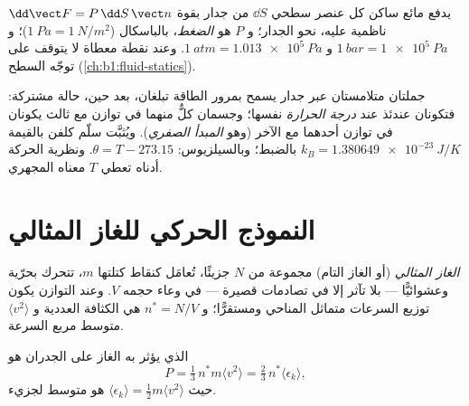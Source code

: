 \begin{definition}[الضغط]\label{def:b1:kinetic-theory:pressure}
يدفع مائع ساكن كل عنصر سطحي $\dd S$ من جدار بقوة
$\dd\vect F = P\,\dd S\,\vect n$ ناظمية عليه، نحو الجدار؛ و $P$ هو
\emph{الضغط}، بالباسكال ($\qty{1}{Pa} = \qty{1}{N/m^2}$)؛ و $\qty{1}{bar}
= \qty{1e5}{Pa}$ و $\qty{1}{atm} = \qty{1.013e5}{Pa}$. وعند نقطة معطاة لا
يتوقف على توجّه السطح (\cref{ch:b1:fluid-statics}).
\end{definition}

\begin{definition}\label{def:b1:kinetic-theory:temperature}
جملتان متلامستان عبر جدار يسمح بمرور الطاقة تبلغان، بعد
حين، حالة مشتركة: فتكونان عندئذ عند \emph{درجة الحرارة} نفسها؛
وجسمان كلٌّ منهما في توازن مع ثالث يكونان في توازن أحدهما
مع الآخر (وهو \emph{المبدأ الصفري}). ويُثبَّت سلّم كلفن بالقيمة
$k_B = \qty{1.380649e-23}{J/K}$ بالضبط؛ وبالسيلزيوس: $\theta = T - 273.15$.
ونظرية الحركة أدناه تعطي $T$ معناه المجهري.
\end{definition}

\section{النموذج الحركي للغاز المثالي}

\begin{definition}\label{def:b1:kinetic-theory:model}
\emph{الغاز المثالي} (أو الغاز التام) مجموعة من $N$ جزيئًا،
تُعامَل كنقاط كتلتها $m$، تتحرك بحرّية وعشوائيًّا --- بلا
تآثر إلا في تصادمات قصيرة --- في وعاء حجمه $V$.
وعند التوازن يكون توزيع السرعات متماثل المناحي ومستقرًّا؛
و $n^* = N/V$ هي الكثافة العددية و $\langle v^2\rangle$ متوسط مربع
السرعة.
\end{definition}

\begin{theorem}\label{thm:b1:kinetic-theory:pressure}
 الذي يؤثر به الغاز على الجدران هو
\[
P = \tfrac13\,n^*m\langle v^2\rangle = \tfrac23\,n^*\langle\epsilon_k\rangle ,
\]
حيث $\langle\epsilon_k\rangle = \tfrac12 m\langle v^2\rangle$ هو متوسط
 لجزيء.
\end{theorem}

